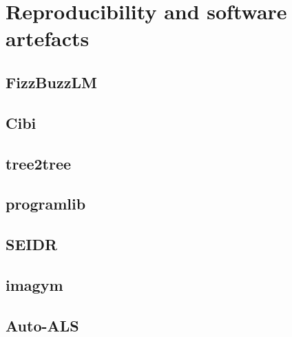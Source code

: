 \chapter{Reproducibility and software artefacts}

\section{FizzBuzzLM}

\section{Cibi}

\section{tree2tree}

\section{programlib}

\section{SEIDR}

\section{imagym}

\section{Auto-ALS}